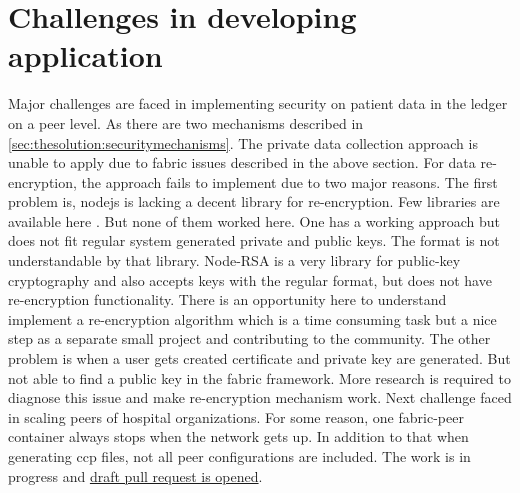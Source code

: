 \section{Challenges in developing application}
\label{sec:results:challenges}
Major challenges are faced in implementing security on patient data in the ledger on a peer level. As there are two mechanisms described in \ref{sec:thesolution:securitymechanisms}. The private data collection approach is unable to apply due to fabric issues described in the above section. For data re-encryption, the approach fails to implement due to two major reasons. The first problem is, nodejs is lacking a decent library for re-encryption. Few libraries are available here \cite{nodejs-reencryption-libraries}. But none of them worked here. One has a working approach but does not fit regular system generated private and public keys. The format is not understandable by that library. Node-RSA is a very library for public-key cryptography and also accepts keys with the regular format, but does not have re-encryption functionality. There is an opportunity here to understand implement a re-encryption algorithm which is a time consuming task but a nice step as a separate small project and contributing to the community. The other problem is when a user gets created certificate and private key are generated. But not able to find a public key in the fabric framework. More research is required to diagnose this issue and make re-encryption mechanism work.
Next challenge faced in scaling peers of hospital organizations. For some reason, one fabric-peer container always stops when the network gets up. In addition to that when generating ccp files, not all peer configurations are included. The work is in progress and \href{https://github.com/kshitijyelpale/blockchain-hyperledger-fabric-electronic-patient-records/pull/51}{draft pull request is opened}.


